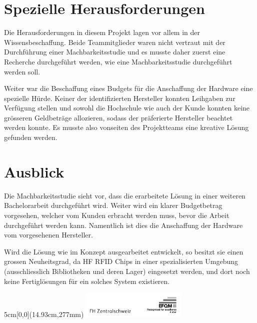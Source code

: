 \documentclass[
	a4paper
]{scrartcl}
\begin{document}
\section{Spezielle Herausforderungen}
Die Herausforderungen in diesem Projekt lagen vor allem in der Wissensbeschaffung. Beide Teammitglieder waren nicht vertraut mit der Durchführung einer Machbarkeitsstudie und es musste daher zuerst eine Recherche durchgeführt werden, wie eine Machbarkeitsstudie durchgeführt werden soll.

Weiter war die Beschaffung eines Budgets für die Anschaffung der Hardware eine spezielle Hürde. Keiner der identifizierten Hersteller konnten Leihgaben zur Verfügung stellen und sowohl die Hochschule wie auch der Kunde konnten keine grösseren Geldbeträge allozieren, sodass der präferierte Hersteller beachtet werden konnte. Es musste also vonseiten des Projektteams eine kreative Lösung gefunden werden.

\section{Ausblick}
Die Machbarkeitsstudie sieht vor, dass die erarbeitete Lösung in einer weiteren Bachelorarbeit durchgeführt wird. Weiter wird ein klarer Budgetbetrag vorgesehen, welcher vom Kunden erbracht werden muss, bevor die Arbeit durchgeführt werden kann. Namentlich ist dies die Anschaffung der Hardware vom vorgesehenen Hersteller.

Wird die Lösung wie im Konzept ausgearbeitet entwickelt, so besitzt sie einen grossen Neuheitsgrad, da HF RFID Chips in einer spezialisierten Umgebung (ausschliesslich Bibliotheken und deren Lager) eingesetzt werden, und dort noch keine Fertiglösungen für ein solches System existieren.

\vspace{0.5em}
\noindent
\begin{textblock*}{5cm}[0,0](14.93cm,277mm)
	\includegraphics[keepaspectratio,width=5cm]{img/FHZ_Logo}
\end{textblock*}
\end{document}
